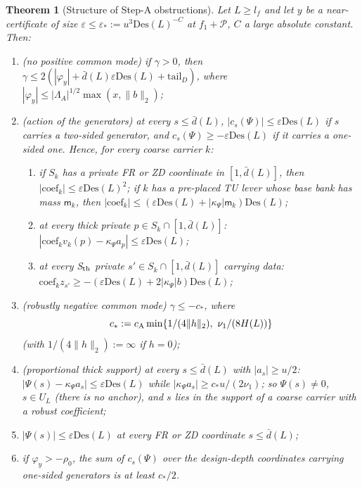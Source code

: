 \documentclass[10pt]{amsart}
\newtheorem{theorem}{Theorem}[section]
\theoremstyle{definition}
\theoremstyle{remark}
\begin{document}
\begin{theorem}[Structure of Step-A obstructions]\label{thm:III-Aobs}
Let $L\ge l_f$ and let $y$ be a near-certificate of size $\varepsilon\le
\varepsilon_*:=u^3\mathrm{Des}(L)^{-C}$ at $f_1+\mathcal P$, $C$ a large absolute
constant.  Then:
\begin{enumerate}
\item[(1)] \textup{(no positive common mode)} if $\gamma>0$, then $\gamma\le
2(|\varphi_y|+\bar d(L)\varepsilon\mathrm{Des}(L)+\mathrm{tail}_D)$, where
$|\varphi_y|\le|\Lambda_A|^{1/2}\max(x,\|b\|_2)$;
\item[(2)] \textup{(action of the generators)} at every $s\le\bar d(L)$,
$|c_s(\Psi)|\le\varepsilon\mathrm{Des}(L)$ if $s$ carries a two-sided generator,
and $c_s(\Psi)\ge-\varepsilon\mathrm{Des}(L)$ if it carries a one-sided one.
Hence, for every coarse carrier $k$:
\begin{enumerate}
\item[(2a)] if $S_k$ has a private FR or ZD coordinate in $[1,\bar d(L)]$, then
$|\mathrm{coef}_k|\le\varepsilon\mathrm{Des}(L)^2$; if $k$ has a pre-placed TU lever
whose base bank has mass $\mathsf m_k$, then $|\mathrm{coef}_k|\le(\varepsilon
\mathrm{Des}(L)+|\kappa_\Psi|\mathsf m_k)\mathrm{Des}(L)$;
\item[(2b)] at every thick private $p\in S_k\cap[1,\bar d(L)]$:
$|\mathrm{coef}_kv_k(p)-\kappa_\Psi a_p|\le\varepsilon\mathrm{Des}(L)$;
\item[(2c)] at every S$_{\rm th}$ private $s'\in S_k\cap[1,\bar d(L)]$ carrying
data: $\mathrm{coef}_kz_{s'}\ge-(\varepsilon\mathrm{Des}(L)+2|\kappa_\Psi|b)
\mathrm{Des}(L)$;
\end{enumerate}
\item[(3)] \textup{(robustly negative common mode)} $\gamma\le-c_*$, where
\[
 c_*:=c_{\rm A}\min\{1/(4\|h\|_2),\ \nu_1/(8H(L))\}
\]
\textup{(}with $1/(4\|h\|_2):=\infty$ if $h=0$\textup{)};
\item[(4)] \textup{(proportional thick support)} at every $s\le\bar d(L)$ with
$|a_s|\ge u/2$: $|\Psi(s)-\kappa_\Psi a_s|\le\varepsilon\mathrm{Des}(L)$ while
$|\kappa_\Psi a_s|\ge c_*u/(2\nu_1)$; so $\Psi(s)\ne0$, $s\in U_L$ \textup{(}there is
no anchor\textup{)}, and $s$ lies in the support of a coarse carrier with a robust
coefficient;
\item[(5)] $|\Psi(s)|\le\varepsilon\mathrm{Des}(L)$ at every FR or ZD coordinate
$s\le\bar d(L)$;
\item[(6)] if $\varphi_y>-\rho_0$, the sum of $c_s(\Psi)$ over the design-depth
coordinates carrying one-sided generators is at least $c_*/2$.
\end{enumerate}
\end{theorem}
\end{document}

